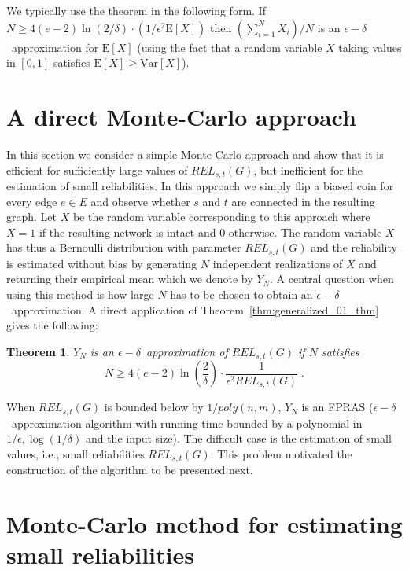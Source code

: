 \documentclass{article}
\newtheorem{theorem}{Theorem}
\newcommand\ex{\mathrm{E}}
\newcommand\var{\mathrm{Var}}
\begin{document}
We typically use the theorem in the following form. If
$N\geq 4(e-2)\ln(2/\delta)\cdot
(1/\epsilon^2\ex[X])$ then $(\sum_{i=1}^N X_i)/N$ is an
$\epsilon-\delta$~approximation for $\ex[X]$ (using the fact
that a random variable $X$ taking values in $[0,1]$
satisfies $\ex[X]\geq\var[X]$).

\section{A direct Monte-Carlo approach}\label{sec:direct_montecarlo}

In this section we consider a simple \mbox{Monte-Carlo} approach and
show that it is efficient for sufficiently large values of
$\mathit{REL}_{s,t}(G)$, but inefficient for the estimation of small
reliabilities.
In this approach we simply flip a biased coin for every edge $e\in E$
and observe whether $s$ and $t$ are connected in the resulting graph. Let
$X$ be the random variable corresponding to this approach
where $X=1$ if the resulting network is intact and $0$ otherwise.
The random variable $X$ has thus a Bernoulli
distribution with parameter $\mathit{REL}_{s,t}(G)$
and the reliability is estimated without bias by 
generating $N$ independent realizations of $X$ and returning their
empirical mean which we denote by $Y_N$. 
A central question when using this method is how
large $N$ has to be chosen to obtain an $\epsilon-\delta$~approximation.
A direct application of Theorem~\ref{thm:generalized_01_thm}
gives the following:

\begin{theorem}\label{thm:montecarlo_approx}
$Y_N$ is an $\epsilon-\delta$~approximation of
$\mathit{REL}_{s,t}(G)$ if $N$ satisfies
\begin{equation*}
N\geq
4(e-2)\ln\left(\frac{2}{\delta}\right)\cdot\frac{1}{\epsilon^2
\mathit{REL}_{s,t}(G)}\;.
\end{equation*}
\end{theorem}

When $\mathit{REL}_{s,t}(G)$ is bounded below by
$1/poly(n,m)$, $Y_N$ is an FPRAS ($\epsilon-\delta$~approximation algorithm
with running time bounded by a polynomial in $1/\epsilon,\log(1/\delta)$ and the
input size). The difficult case is the estimation of small values, i.e.,
small reliabilities $\mathit{REL}_{s,t}(G)$. This problem
motivated the construction of the algorithm to be presented next.

\section{Monte-Carlo method for estimating small reliabilities}\label{sec:our_algorithm}
\end{document}
